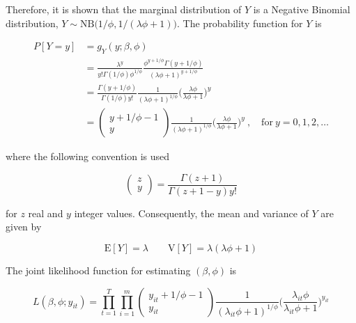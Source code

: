 \documentclass[preprint, 3p, authoryear]{elsarticle} %
\begin{document}
Therefore, it is shown that the marginal distribution of \(Y\) is a Negative Binomial distribution, \(Y\sim\mathrm{NB}\big(1/\phi,1/(\lambda\phi+1)\big)\). The probability function for \(Y\) is

\begin{equation} \label{eq:pdfMix}
  \begin{aligned}
    P[Y=y]&=g_{Y}(y; \beta, \phi) \\
    &=\frac{\lambda^{y}}{y!\Gamma(1/\phi)\phi^{1/\phi}}\frac{\phi^{y+1/\phi}\Gamma(y+1/\phi)}{(\lambda \phi + 1)^{y+1/\phi}} \\
    &=\frac{\Gamma(y+1/\phi)}{\Gamma(1/\phi)y!}\frac{1}{(\lambda\phi+1)^{1/\phi}}\bigg(\frac{\lambda\phi}{\lambda\phi+1}\bigg)^{y} \\
    &=\begin{pmatrix} y+1/\phi-1 \\ y \end{pmatrix} \frac{1}{(\lambda\phi+1)^{1/\phi}}\bigg(\frac{\lambda\phi}{\lambda\phi+1}\bigg)^{y} \ , \quad \mathrm{for} \ y = 0, 1, 2, \dots
  \end{aligned}
\end{equation}

where the following convention is used

\begin{equation}
  \begin{pmatrix} z\\y \end{pmatrix} = \frac{\Gamma(z+1)}{\Gamma(z+1-y)y!}
\end{equation}

for \(z\) real and \(y\) integer values. Consequently, the mean and variance of \(Y\) are given by

\begin{equation}\label{eq:meanNB}
  \mathrm{E}[Y] = \lambda \qquad \mathrm{V}[Y] = \lambda (\lambda \phi + 1)
\end{equation}

The joint likelihood function for estimating \((\beta,\phi)\) is

\begin{equation}\label{eq:jnllPoisG}
  L( \beta, \phi; y_{it})=\prod_{t=1}^{T}\prod_{i=1}^{m} \begin{pmatrix} y_{it}+1/\phi-1 \\ y_{it} \end{pmatrix} \frac{1}{(\lambda_{it}\phi+1)^{1/\phi}}\bigg(\frac{\lambda_{it}\phi}{\lambda_{it}\phi+1}\bigg)^{y_{it}}
\end{equation}
\end{document}
